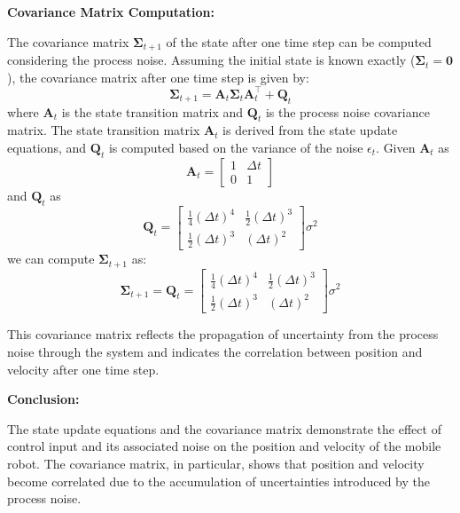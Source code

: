 \documentclass[answers]{exam}
\begin{document}
\begin{questions}
\begin{parts}
\begin{solution}
            \textbf{Covariance Matrix Computation:}
            
            The covariance matrix \(\mathbf{\Sigma}_{t+1}\) of the state after one time step can be computed considering the process noise. Assuming the initial state is known exactly (\(\mathbf{\Sigma}_t = \mathbf{0}\)), the covariance matrix after one time step is given by:
            \begin{equation}
            \mathbf{\Sigma}_{t+1} = \mathbf{A}_t \mathbf{\Sigma}_t \mathbf{A}_t^\top + \mathbf{Q}_t
            \end{equation}
            where \(\mathbf{A}_t\) is the state transition matrix and \(\mathbf{Q}_t\) is the process noise covariance matrix. The state transition matrix \(\mathbf{A}_t\) is derived from the state update equations, and \(\mathbf{Q}_t\) is computed based on the variance of the noise \(\epsilon_t\). Given \(\mathbf{A}_t\) as
            \[\mathbf{A}_t = \begin{bmatrix} 1 & \Delta t \\ 0 & 1 \end{bmatrix}\]
            and \(\mathbf{Q}_t\) as
            \[\mathbf{Q}_t = \begin{bmatrix} \frac{1}{4}(\Delta t)^4 & \frac{1}{2}(\Delta t)^3 \\ \frac{1}{2}(\Delta t)^3 & (\Delta t)^2 \end{bmatrix} \sigma^2\]
            we can compute \(\mathbf{\Sigma}_{t+1}\) as:
            \begin{equation}
            \mathbf{\Sigma}_{t+1} = \mathbf{Q}_t = \begin{bmatrix} \frac{1}{4}(\Delta t)^4 & \frac{1}{2}(\Delta t)^3 \\ \frac{1}{2}(\Delta t)^3 & (\Delta t)^2 \end{bmatrix} \sigma^2
            \end{equation}
            
            This covariance matrix reflects the propagation of uncertainty from the process noise through the system and indicates the correlation between position and velocity after one time step.
            
            \textbf{Conclusion:}
            
            The state update equations and the covariance matrix demonstrate the effect of control input and its associated noise on the position and velocity of the mobile robot. The covariance matrix, in particular, shows that position and velocity become correlated due to the accumulation of uncertainties introduced by the process noise.
        \end{solution}
            


\end{parts}
\end{questions}
\end{document}

